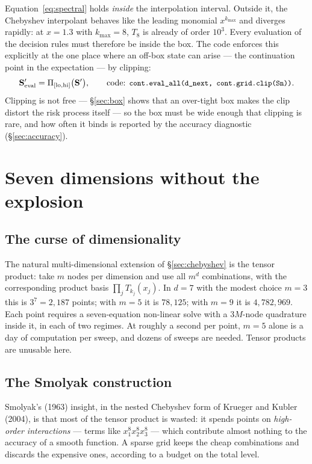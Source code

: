 \documentclass[11pt]{article}
\numberwithin{equation}{section}
\newcommand{\code}[1]{\texttt{\small #1}}
\newcommand{\bS}{\mathbf{S}}
\theoremstyle{definition}
\theoremstyle{plain}
\theoremstyle{remark}
\begin{document}
Equation~\eqref{eq:spectral} holds \emph{inside} the interpolation interval. Outside
it, the Chebyshev interpolant behaves like the leading monomial $x^{k_{\max}}$ and
diverges rapidly: at $x=1.3$ with $k_{\max}=8$, $T_8$ is already of order $10^{3}$.
Every evaluation of the decision rules must therefore be inside the box. The code
enforces this explicitly at the one place where an off-box state can arise --- the
continuation point in the expectation --- by clipping:
\begin{equation}
\bS'_{\text{eval}}=\Pi_{[\text{lo},\text{hi}]}\bigl(\bS'\bigr),
\qquad
\text{code: \code{cont.eval\_all(d\_next, cont.grid.clip(Sn))}} .
\label{eq:clip}
\end{equation}
Clipping is not free --- \S\ref{sec:box} shows that an over-tight box makes the clip
distort the risk process itself --- so the box must be wide enough that clipping is
rare, and how often it binds is reported by the accuracy diagnostic
(\S\ref{sec:accuracy}).

\section{Seven dimensions without the explosion}
\label{sec:smolyak}

\subsection{The curse of dimensionality}

The natural multi-dimensional extension of \S\ref{sec:chebyshev} is the tensor
product: take $m$ nodes per dimension and use all $m^{d}$ combinations, with the
corresponding product basis $\prod_{j}T_{k_j}(x_j)$. In $d=7$ with the modest choice
$m=3$ this is $3^{7}=2{,}187$ points; with $m=5$ it is $78{,}125$; with $m=9$ it is
$4{,}782{,}969$. Each point requires a seven-equation non-linear solve with a
$3M$-node quadrature inside it, in each of two regimes. At roughly a second per
point, $m=5$ alone is a day of computation per sweep, and dozens of sweeps are
needed. Tensor products are unusable here.

\subsection{The Smolyak construction}

Smolyak's (1963) insight, in the nested Chebyshev form of Krueger and Kubler (2004),
is that most of the tensor product is wasted: it spends points on \emph{high-order
interactions} --- terms like $x_1^{8}x_2^{8}x_3^{8}$ --- which contribute almost
nothing to the accuracy of a smooth function. A sparse grid keeps the cheap
combinations and discards the expensive ones, according to a budget on the total
level.
\end{document}
